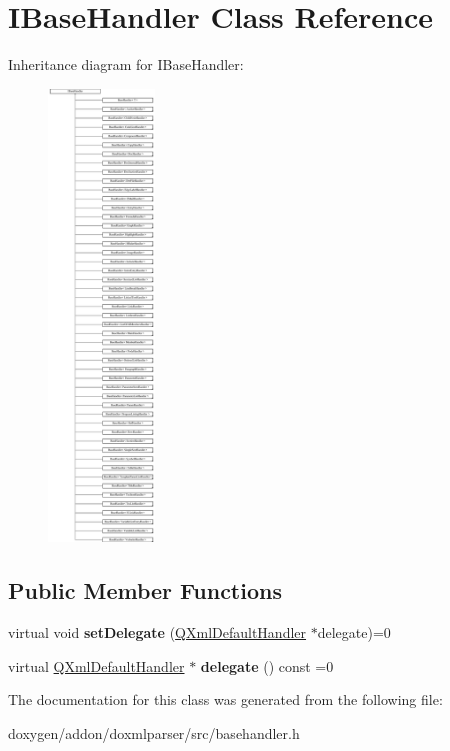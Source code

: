 \hypertarget{class_i_base_handler}{}\section{I\+Base\+Handler Class Reference}
\label{class_i_base_handler}
Inheritance diagram for I\+Base\+Handler\+:\begin{figure}[H]
\begin{center}
\leavevmode
\includegraphics[height=12.000000cm]{class_i_base_handler}
\end{center}
\end{figure}
\subsection*{Public Member Functions}
\begin{DoxyCompactItemize}
\item 
\mbox{\label{class_i_base_handler_ad26c98fb9119383d980b09375ffed9ea}} 
virtual void {\bfseries set\+Delegate} (\mbox{\hyperlink{class_q_xml_default_handler}{Q\+Xml\+Default\+Handler}} $\ast$delegate)=0
\item 
\mbox{\label{class_i_base_handler_a59ed7fcb51eb53855f7b07729178e744}} 
virtual \mbox{\hyperlink{class_q_xml_default_handler}{Q\+Xml\+Default\+Handler}} $\ast$ {\bfseries delegate} () const =0
\end{DoxyCompactItemize}


The documentation for this class was generated from the following file\+:\begin{DoxyCompactItemize}
\item 
doxygen/addon/doxmlparser/src/basehandler.\+h\end{DoxyCompactItemize}
